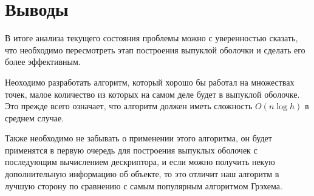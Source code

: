 \section{Выводы} \label{subsect1_4}

В итоге анализа текущего состояния проблемы можно с уверенностью сказать, что необходимо пересмотреть этап построения выпуклой оболочки и сделать его более эффективным.

Неоходимо разработать алгоритм, который хорошо бы работал на множествах точек, малое количество из которых на самом деле будет в выпуклой оболочке. Это прежде всего означает, что алгоритм должен иметь сложность $O(n \log h)$ в среднем случае.

Также необходимо не забывать о применении этого алгоритма, он будет применятся в первую очередь для построения выпуклых оболочек с последующим вычислением дескриптора, и если можно получить некую дополнительную информацию об объекте, то это отличит наш алгоритм в лучшую сторону по сравнению с самым популярным алгоритмом Грэхема.



